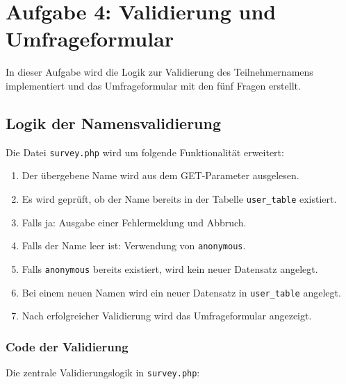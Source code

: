 
\chapter{Aufgabe 4: Validierung und Umfrageformular}
\label{chap:aufgabe4}
\thispagestyle{fancy}

In dieser Aufgabe wird die Logik zur Validierung des Teilnehmernamens implementiert und das Umfrageformular mit den fünf Fragen erstellt.

\section{Logik der Namensvalidierung}

Die Datei \texttt{survey.php} wird um folgende Funktionalität erweitert:

\begin{enumerate}
    \item Der übergebene Name wird aus dem GET-Parameter ausgelesen.
    \item Es wird geprüft, ob der Name bereits in der Tabelle \texttt{user\_table} existiert.
    \item Falls ja: Ausgabe einer Fehlermeldung und Abbruch.
    \item Falls der Name leer ist: Verwendung von \texttt{anonymous}.
    \item Falls \texttt{anonymous} bereits existiert, wird kein neuer Datensatz angelegt.
    \item Bei einem neuen Namen wird ein neuer Datensatz in \texttt{user\_table} angelegt.
    \item Nach erfolgreicher Validierung wird das Umfrageformular angezeigt.
\end{enumerate}

\subsection{Code der Validierung}

Die zentrale Validierungslogik in \texttt{survey.php}:



